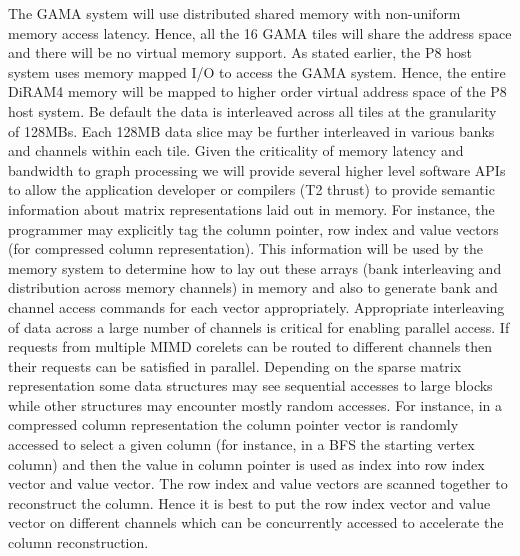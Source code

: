 The GAMA system will use distributed shared memory with  non-uniform memory access latency. Hence, all the 16 GAMA tiles will share the address space and there will be no virtual memory support.  As stated earlier, the P8 host system uses memory mapped I/O to access the GAMA system. Hence, the entire DiRAM4 memory will be mapped to higher order virtual address space of the P8 host system. %
Be default the data is interleaved across all tiles at the granularity of 128MBs. Each 128MB data slice may be further interleaved in various banks and channels within each tile.  Given the criticality of memory latency and bandwidth to graph processing we will provide several higher level software APIs to allow the application developer or compilers (T2 thrust) to provide semantic information about matrix representations laid out in memory. For instance, the programmer may explicitly tag the column pointer, row index and value vectors (for compressed column representation). This information will be used by the memory system to determine how to lay out these arrays (bank interleaving and distribution across memory channels)  in memory and also to generate bank and channel access commands for each vector appropriately. 
Appropriate interleaving of data across a large number of channels is critical for enabling parallel access. If requests from multiple MIMD corelets can be routed to different channels then their requests can be satisfied in parallel. Depending on the sparse matrix representation some data structures may see sequential accesses to large blocks while other structures may encounter mostly random accesses. For instance, in a compressed column  representation the column pointer vector is randomly accessed to select a given column (for instance, in a BFS the starting vertex column) and then the value in column pointer is used as index into row index  vector and value vector. The row index and value vectors are scanned together to reconstruct the column. Hence it is best to put the row index vector and value vector on different channels which can be concurrently accessed to accelerate the column reconstruction.  

